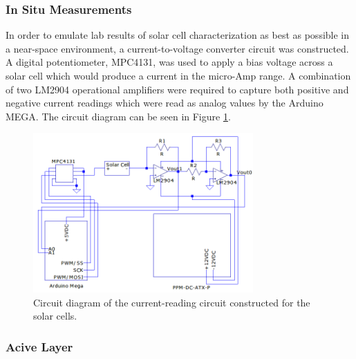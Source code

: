 \subsubsection{In Situ Measurements}

In order to emulate lab results of solar cell characterization as best as possible in a near-space environment, a current-to-voltage converter circuit was constructed. A digital potentiometer, MPC4131, was used to apply a bias voltage across a solar cell which would produce a current in the micro-Amp range. A combination of two LM2904 operational amplifiers were required to capture both positive and negative current readings which were read as analog values by the Arduino MEGA. The circuit diagram can be seen in Figure \ref{fig:solar-cell-circuit}.

\begin{figure}[h!]
	\begin{center}
		\includegraphics[width=0.75\textwidth]{figures/solar-cell-circuit-diagram.png}
		\caption{Circuit diagram of the current-reading circuit constructed for the solar cells.}
		\label{fig:solar-cell-circuit}
	\end{center}
\end{figure}

\subsubsection{Acive Layer}
	
